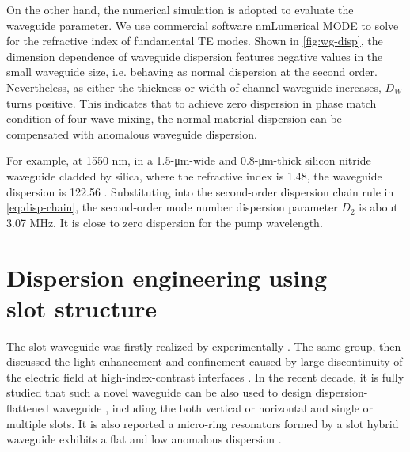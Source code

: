 \begin{figure}
    \centering
    
    \label{fig:Luke-si3n4}
\end{figure}

On the other hand, the numerical simulation is adopted to evaluate the waveguide parameter.
We use commercial software \si{\nm}{Lumerical MODE} to solve for the refractive index of fundamental TE modes.
Shown in \autoref{fig:wg-disp}, the dimension dependence of waveguide dispersion features negative values in the small waveguide size, i.e. behaving as normal dispersion at the second order. Nevertheless, as either the thickness or width of channel waveguide increases,
$D_W$ turns positive. This indicates that to achieve zero dispersion in phase match condition of four wave mixing, the normal material dispersion can be compensated with anomalous waveguide dispersion. 

For example, at 1550 \si{\nm}, in a 1.5-\si{\um}-wide and 0.8-\si{\um}-thick silicon nitride waveguide cladded by silica, where the refractive index is 1.48,
the waveguide dispersion is 122.56 \dispu. Substituting into the second-order dispersion chain rule in \autoref{eq:disp-chain}, the second-order mode number dispersion parameter $ D_2 $ is about 3.07 MHz. It is close to zero dispersion for the pump wavelength.

\begin{figure}
	\centering
	
	\label{fig:wg-disp}
\end{figure}

\section[{Dispersion engineering using slot structure}]{Dispersion engineering using \\ slot structure}

The slot waveguide was firstly realized by \citeauthor{Xu2004} experimentally \cite{Xu2004}. The same group, \citeauthor{Almeida2004} then discussed the light enhancement and confinement caused by large discontinuity of the electric field at high-index-contrast interfaces \cite{Almeida2004}. In the recent decade, it is fully studied that such a novel waveguide can be also used to design dispersion-flattened waveguide \cites{Mas2010, Zhang2010, Zhu2012, Nolte2013}, including the both vertical or horizontal and single or multiple slots. It is also reported a micro-ring resonators formed by a slot hybrid waveguide 
exhibits a flat and low anomalous dispersion \cite{Zhang2013}.

